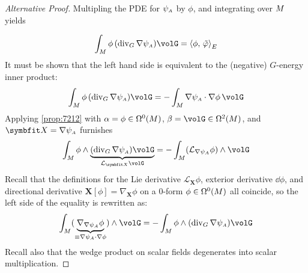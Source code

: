 \begin{proof}[Alternative Proof]
Multipling the PDE for $\psi_{\scriptscriptstyle{A}}$ by $\phi$, and integrating over $M$ yields

$$
\int_{\PlaneManifold} \phi \, (\operatorname{div}_{G}\nabla \WarpFA)  \volG 
= \left<\phi,\, \WarpSV\right>_E
$$
It must be shown that the left hand side is equivalent to the (negative) $G$-energy inner product:
$$
\int_{\PlaneManifold} \phi\, (\operatorname{div}_{G} \nabla \WarpFA) \volG
=- \int_{\PlaneManifold} \nabla \WarpFA \cdot \nabla \phi \, \volG 
$$
Applying \cref{prop:7212} with \(\alpha = \phi \in \Omega^0(M)\), \(\beta = \volG \in \Omega^2(\PlaneManifold)\), and \(\bm{X} = \nabla \WarpFA\) furnishes
\[
\int_{\PlaneManifold} \phi \wedge \underbrace{(
\operatorname{div}_G \nabla \WarpFA
)\volG}_{\mathcal{L}_{\bm{X}}\volG}  = -\int_{\PlaneManifold} (\mathcal{L}_{\nabla \WarpFA} \phi ) \wedge \volG 
\]
Recall that the definitions for the Lie derivative \(\mathcal{L}_{\bm{X}} \phi\), exterior derivative \(\dd \phi\), and directional derivative \(\bm{X}[\phi] = \nabla_{\bm{X}} \phi\) on a 0-form \(\phi \in \Omega^0(M)\) all coincide, so the left side of the equality is rewritten as:
\[
\int_{\PlaneManifold} (\underbrace{\nabla_{\nabla \WarpFA} \phi}_{\equiv \nabla \WarpFA \cdot \nabla \phi}) \wedge \volG 
= - \int_{\PlaneManifold} \phi \wedge (\operatorname{div}_G \nabla \WarpFA)\volG 
\]
Recall also that the wedge product on scalar fields degenerates into scalar multiplication.
\end{proof}

